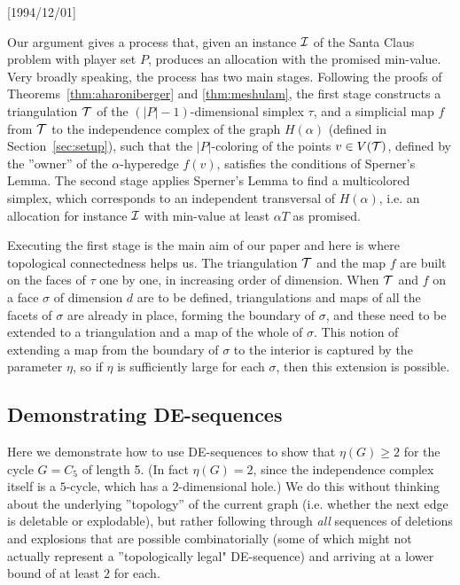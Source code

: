 \NeedsTeXFormat{LaTeX2e}[1994/12/01]\documentclass[letterpaper, 11pt]{article}
\theoremstyle{definition}
\theoremstyle{remark}
\numberwithin{equation}{section}
\begin{document}
Our argument gives a process that, given an instance ${\cal I}$ of the
Santa Claus problem with player set $P$, produces an allocation with
the promised min-value. Very broadly speaking, the process has two
main stages. Following the proofs of Theorems~\ref{thm:aharoniberger}
and \ref{thm:meshulam}, the first stage constructs a triangulation
${\cal T}$ of the 
$(|P|-1)$-dimensional simplex $\tau$, and a simplicial map $f$ from
${\cal T}$ to the independence complex of the graph $H(\alpha)$
(defined in Section~\ref{sec:setup}), such
that the $|P|$-coloring of the points $v \in V({\cal T})$, defined by
the ''owner'' of 
the $\alpha$-hyperedge $f(v)$, satisfies the conditions of Sperner's
Lemma. The second stage applies Sperner's Lemma to find a multicolored
simplex, which corresponds to an independent transversal of
$H(\alpha)$, i.e. an allocation for instance ${\cal I}$ with
min-value at least $\alpha T$ as promised.

Executing the first stage is the main aim of our paper and here is where
topological connectedness helps us. 
The triangulation ${\cal T}$ and the map $f$ are built on the faces of
$\tau$ one by one, in increasing order of dimension.
When ${\cal T}$ and $f$ on a face
$\sigma$ of dimension $d$ are to be defined, triangulations and
maps of all the facets of $\sigma$ are already in place, forming the
boundary of $\sigma$, and these 
need to be extended to a triangulation and a map of the whole of
$\sigma$. 
This notion of extending a map from the boundary of $\sigma$ to the interior is
captured by the parameter $\eta$, so if $\eta$ is sufficiently 
large for each $\sigma$, then this extension is possible. 

\subsection{Demonstrating DE-sequences} \label{sec:example}

Here we demonstrate how to use DE-sequences to show that $\eta(G)\geq
2$ for the cycle $G=C_5$ of length 5. (In fact $\eta(G)=2$, since the
independence complex itself is a $5$-cycle, which has a
$2$-dimensional hole.) We do this without thinking about the underlying ''topology'' of the current graph (i.e. whether the next edge is deletable or explodable), but rather following through {\em all} sequences of deletions and explosions that are possible combinatorially (some of which might not actually represent a ''topologically legal" DE-sequence) and arriving at a lower bound of at least $2$ for each. 
\end{document}
